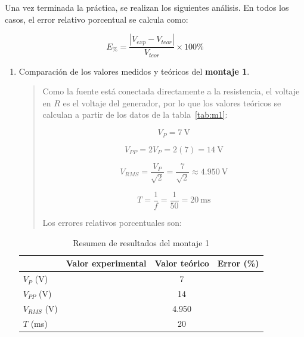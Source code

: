 \documentclass{article}
\newcommand{\vacio}[1][2cm]{\underline{\hspace{#1}}}
\begin{document}
    Una vez terminada la práctica, se realizan los siguientes análisis. En todos los casos, el error relativo porcentual se calcula como:

    \[
        E_{\%} = \frac{\left|V_{exp} - V_{teor}\right|}{V_{teor}} \times 100\%
    \]

    \begin{enumerate}
        \item Comparación de los valores medidos y teóricos del \textbf{montaje 1}.

        \begin{quote}
            Como la fuente está conectada directamente a la resistencia, el voltaje en $R$ es el voltaje del generador, por lo que los valores teóricos se calculan a partir de los datos de la tabla~\ref{tab:m1}:

            \[
                V_P = \SI{7}{\volt}
            \]

            \[
                V_{PP} = 2V_P = 2(7) = \SI{14}{\volt}
            \]

            \[
                V_{RMS} = \frac{V_P}{\sqrt{2}} = \frac{7}{\sqrt{2}} \approx \SI{4.950}{\volt}
            \]

            \[
                T = \frac{1}{f} = \frac{1}{50} = \SI{20}{\milli\second}
            \]

            Los errores relativos porcentuales son:
        \end{quote}

        \begin{table}[ht!]
            \centering
            \begin{tabular}{lccc}
                \toprule
                                & Valor experimental & Valor teórico & Error (\%)    \\
                \midrule
                $V_P$ (V)       & \vacio[1.8cm]      & 7             & \vacio[1.5cm] \\
                $V_{PP}$ (V)    & \vacio[1.8cm]      & 14            & \vacio[1.5cm] \\
                $V_{RMS}$ (V)   & \vacio[1.8cm]      & 4.950         & \vacio[1.5cm] \\
                $T$ (ms)        & \vacio[1.8cm]      & 20            & \vacio[1.5cm] \\
                \bottomrule
            \end{tabular}
            \caption{Resumen de resultados del montaje 1}\label{tab:res-m1}
        \end{table}


\end{enumerate}
\end{document}
